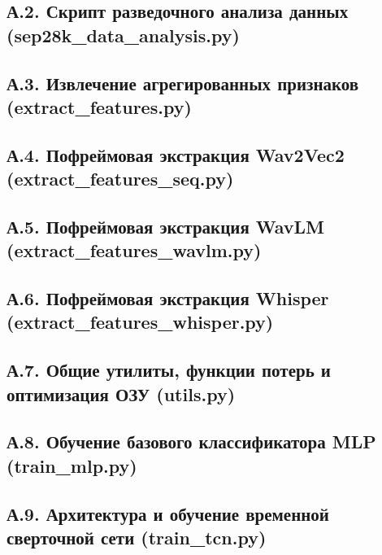 \documentclass[a4paper,14pt]{extarticle}
\begin{document}
	\subsection*{А.2. Скрипт разведочного анализа данных (sep28k\_data\_analysis.py)}
	
	
	\subsection*{А.3. Извлечение агрегированных признаков (extract\_features.py)}
	
	
	\subsection*{А.4. Пофреймовая экстракция Wav2Vec2 (extract\_features\_seq.py)}
	
	
	\subsection*{А.5. Пофреймовая экстракция WavLM (extract\_features\_wavlm.py)}
	
	
	\subsection*{А.6. Пофреймовая экстракция Whisper (extract\_features\_whisper.py)}
	
	
	\subsection*{А.7. Общие утилиты, функции потерь и оптимизация ОЗУ (utils.py)}
	
	
	\subsection*{А.8. Обучение базового классификатора MLP (train\_mlp.py)}
	
	
	\subsection*{А.9. Архитектура и обучение временной сверточной сети (train\_tcn.py)}
	
	
\end{document}
